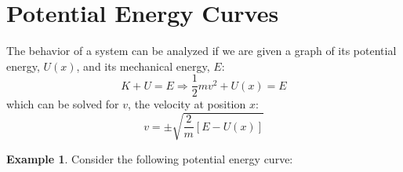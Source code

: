 \documentclass{article}
\theoremstyle{definition}
\theoremstyle{definition}
\theoremstyle{definition}
\theoremstyle{definition}
\theoremstyle{definition}
\newtheorem*{example}{Example}
\begin{document}
\section{Potential Energy Curves}
The behavior of a system can be analyzed if we are given a graph of its potential energy, $U(x)$, and its mechanical energy, $E$:
\begin{equation*}
    K+U=E \Rightarrow \frac{1}{2}mv^{2} + U(x) = E
\end{equation*}
which can be solved for $v$, the velocity at position $x$:
\begin{equation*}
    v=\pm \sqrt{\frac{2}{m}[E-U(x)]} 
\end{equation*}

\begin{example}    

Consider the following potential energy curve:


\begin{center}

\begin{tikzpicture}[x=0.75pt,y=0.75pt,yscale=-1,xscale=1]


\end{tikzpicture}
\end{center}
\end{example}
\end{document}
